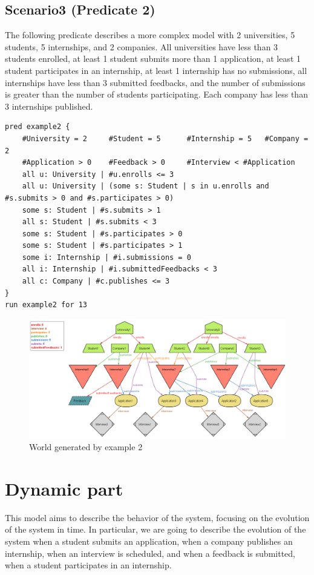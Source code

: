 \subsection{Scenario3 (Predicate 2)}
The following predicate describes a more complex model with 2 universities, 5 students, 5 internships, and 2 companies.
All universities have less than 3 students enrolled, at least 1 student submits more than 1 application, 
at least 1 student participates in an internship, at least 1 internship has no submissions,
all internships have less than 3 submitted feedbacks, and the number of submissions is greater than the 
number of students participating. Each company has less than 3 internships published.
\begin{lstlisting}
pred example2 {
    #University = 2     #Student = 5      #Internship = 5   #Company = 2
    #Application > 0    #Feedback > 0     #Interview < #Application
    all u: University | #u.enrolls <= 3
    all u: University | (some s: Student | s in u.enrolls and #s.submits > 0 and #s.participates > 0)
    some s: Student | #s.submits > 1
    all s: Student | #s.submits < 3
    some s: Student | #s.participates > 0
    some s: Student | #s.participates > 1
    some i: Internship | #i.submissions = 0
    all i: Internship | #i.submittedFeedbacks < 3
    all c: Company | #c.publishes <= 3
}
run example2 for 13
\end{lstlisting}
\begin{figure}[H]
    \centering
    \includegraphics[width=1\textwidth]{Images/Alloy/example2.png}
    \caption{World generated by example 2}\label{fig:example2}
\end{figure}


\section{Dynamic part}
This model aims to describe the behavior of the system, focusing on the evolution of the system in time. In particular, we are going to
describe the evolution of the system when a student submits an application, when a company publishes an internship, when an interview is scheduled,
and when a feedback is submitted, when a student participates in an internship.

